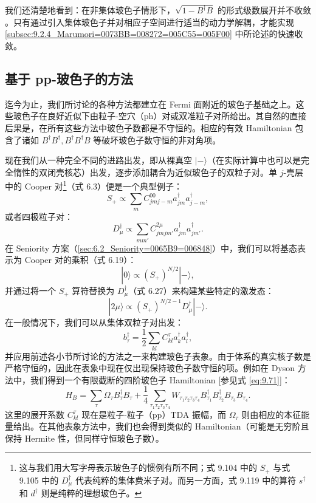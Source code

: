 我们还清楚地看到：在非集体玻色子情形下，$\sqrt{1-B^{\dagger}B}$ 的形式级数展开并不收敛 \cite{Ok74}。只有通过引入集体玻色子并对相应子空间进行适当的动力学解耦，才能实现
\ref{subsec:9.2.4_Marumori=0073BB=008272=005C55=005F00} 中所论述的快速收敛。

\subsection{基于 pp-玻色子的方法\label{subsec:9.2.7_=0057FA=004E8Epp-=0073BB=008272=005B50=007684=0065B9=006CD5}}

迄今为止，我们所讨论的各种方法都建立在 Fermi 面附近的玻色子基础之上。这些玻色子在良好近似下由粒子-空穴（ph）对或双准粒子对所给出。其自然的直接后果是，在所有这些方法中玻色子数都是不守恒的。相应的有效
Hamiltonian 包含了诸如 $B^{\dagger}B^{\dagger},B^{\dagger}B^{\dagger}B$
等破坏玻色子数守恒的非对角项。

现在我们从一种完全不同的进路出发，即从裸真空 $|-\rangle$（在实际计算中也可以是完全惰性的双闭壳核芯）出发，逐步添加耦合为近似玻色子的双粒子对。单
$j$-壳层中的 Cooper 对\footnote{这与我们用大写字母表示玻色子的惯例有所不同；式 9.104 中的 $S_{+}$ 与式 9.105 中的 $D^{\dagger}_{\mu}$
代表纯粹的集体费米子对。而另一方面，式 9.119 中的算符 $s^{\dagger}$ 和 $d^{\dagger}$ 则是纯粹的理想玻色子。}（式 6.3）便是一个典型例子：
\begin{equation}
S_{+}\propto\sum_{m}C^{00}_{jmj-m}a^{\dagger}_{jm}a^{\dagger}_{j-m},\label{eq:9.104}
\end{equation}
或者四极粒子对：
\begin{equation}
D^{\dagger}_{\mu}\propto\sum_{mm'}C^{2\mu}_{jmjm'}a^{\dagger}_{jm}a^{\dagger}_{jm'}.\label{eq:9.105}
\end{equation}
在 Seniority 方案（\ref{sec:6.2_Seniority=0065B9=006848}）中，我们可以将基态表示为
Cooper 对的乘积（式 6.19）：
\[
|0\rangle\propto(S_{+})^{N/2}|-\rangle,
\]
并通过将一个 $S_{+}$ 算符替换为 $D^{\dagger}_{\mu}$（式 6.27）来构建某些特定的激发态：
\begin{equation}
|2\mu\rangle\propto(S_{+})^{N/2-1}D^{\dagger}_{\mu}|-\rangle.\label{eq:9.106}
\end{equation}
在一般情况下，我们可以从集体双粒子对出发：
\begin{equation}
b^{\dagger}_{\tau}=\frac{1}{2}\sum_{kl}C^{\tau}_{kl}a^{\dagger}_{k}a^{\dagger}_{l},\label{eq:9.107}
\end{equation}
并应用前述各小节所讨论的方法之一来构建玻色子表象。由于体系的真实核子数是严格守恒的，因此在表象中现在仅出现保持玻色子数守恒的项。例如在
Dyson 方法中，我们得到一个有限截断的四阶玻色子 Hamiltonian {[}参见式 \ref{eq:9.71}{]}：
\begin{equation}
H_{B}=\sum_{\tau}\Omega_{\tau}B^{\dagger}_{\tau}B_{\tau}+\frac{1}{4}\sum_{\tau_{1}\tau_{2}\tau_{3}\tau_{4}}W_{\tau_{1}\tau_{2}\tau_{3}\tau_{4}}B^{\dagger}_{\tau_{1}}B^{\dagger}_{\tau_{2}}B_{\tau_{3}}B_{\tau_{4}}.\label{eq:9.108}
\end{equation}
这里的展开系数 $C^{\tau}_{kl}$ 现在是粒子-粒子（pp）TDA 振幅，而 $\Omega_{\tau}$ 则由相应的本征能量给出。在其他表象方法中，我们也会得到类似的
Hamiltonian（可能是无穷阶且保持 Hermite 性，但同样守恒玻色子数）。

